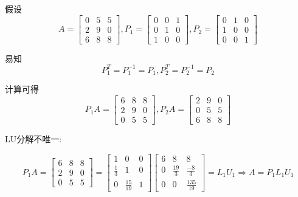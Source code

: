 \begin{example}[$PA=LU$]

    假设
    \begin{equation} A=\left[\begin{array}{lll}0 & 5 & 5 \\ 2 & 9 & 0 \\ 6 & 8 & 8\end{array}\right], P_{1}=\left[\begin{array}{lll}0 & 0 & 1 \\ 0 & 1 & 0 \\ 1 & 0 & 0\end{array}\right], P_{2}=\left[\begin{array}{lll}0 & 1 & 0 \\ 1 & 0 & 0 \\ 0 & 0 & 1\end{array}\right] \end{equation}

    易知
    \begin{equation}P_{1}^{T}=P_{1}^{-1}=P_{1}, P_{2}^{T}=P_{2}^{-1}=P_{2}\end{equation}

    计算可得
    \begin{equation} P_{1} A=\left[\begin{array}{lll}6 & 8 & 8 \\ 2 & 9 & 0 \\ 0 & 5 & 5\end{array}\right], P_{2} A=\left[\begin{array}{lll}2 & 9 & 0 \\ 0 & 5 & 5 \\ 6 & 8 & 8\end{array}\right] \end{equation}

    LU分解不唯一:

    \begin{equation}
        P_{1} A=\left[\begin{array}{lll}
                6 & 8 & 8 \\
                2 & 9 & 0 \\
                0 & 5 & 5
            \end{array}\right]=\left[\begin{array}{ccc}
                1           & 0             & 0 \\
                \frac{1}{3} & 1             & 0 \\
                0           & \frac{15}{19} & 1
            \end{array}\right]\left[\begin{array}{ccc}
                6 & 8            & 8              \\
                0 & \frac{19}{3} & \frac{-8}{3}   \\
                0 & 0            & \frac{135}{19}
            \end{array}\right]=L_{1} U_{1} \Rightarrow A=P_{1} L_{1} U_{1}
    \end{equation}



\end{example}
